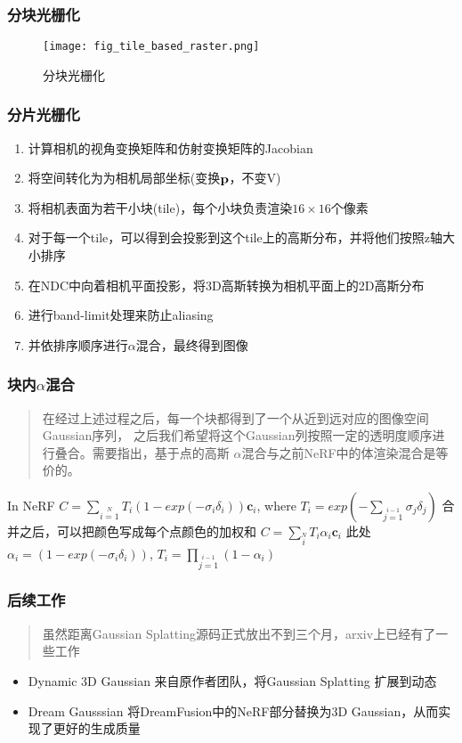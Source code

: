 \begin{frame}
    \frametitle{分块光栅化}
    \begin{figure}[H]
        \centering
        \texttt{[image: fig\_tile\_based\_raster.png]}
        \caption{分块光栅化}
        \label{fig:tile_render}
    \end{figure}
\end{frame}


\begin{frame}
    \frametitle{分片光栅化}
    \begin{enumerate}
        \item 计算相机的视角变换矩阵和仿射变换矩阵的Jacobian
        \item 将空间转化为为相机局部坐标(变换$\bf{p}$，不变V)
        \item 将相机表面为若干小块(tile)，每个小块负责渲染$16\times 16$个像素
        \item 对于每一个tile，可以得到会投影到这个tile上的高斯分布，并将他们按照z轴大小排序
        \item 在NDC中向着相机平面投影，将3D高斯转换为相机平面上的2D高斯分布
        \item 进行band-limit处理来防止aliasing 
        \item 并依排序顺序进行$\alpha$混合，最终得到图像
    \end{enumerate}
\end{frame}

\begin{frame}
    \frametitle{块内$\alpha$混合}
    \begin{quote}
        在经过上述过程之后，每一个块都得到了一个从近到远对应的图像空间Gaussian序列，
        之后我们希望将这个Gaussian列按照一定的透明度顺序进行叠合。需要指出，基于点的高斯
        $\alpha$混合与之前NeRF中的体渲染混合是等价的。
    \end{quote}
    In NeRF
    $C=\sum\limits_{i=1}\limits^{N} T_i(1-exp(-\sigma_i\delta_i))\mathbf{c}_i$, where $T_i=exp(-\sum\limits_{j=1}\limits^{i-1} \sigma_j\delta_j)$
    合并之后，可以把颜色写成每个点颜色的加权和
    $C=\sum\limits_{i}\limits^{N} T_i\alpha_i\mathbf{c}_i$
    此处
    $\alpha_i = (1-exp(-\sigma_i\delta_i))$, $T_i=\prod\limits_{j=1}\limits^{i-1}(1-\alpha_i)$
\end{frame}

\begin{frame}
    \frametitle{后续工作}
    \begin{quote}
        虽然距离Gaussian Splatting源码正式放出不到三个月，arxiv上已经有了一些工作
    \end{quote}
    \begin{itemize}
        \item Dynamic 3D Gaussian \cite{luitenDynamic3DGaussians2023} 来自原作者团队，将Gaussian Splatting 扩展到动态
        \item Dream Gausssian \cite{tangDreamGaussianGenerativeGaussian2023} 将DreamFusion\cite{pooleDreamFusionTextto3DUsing2022}中的NeRF部分替换为3D Gaussian，从而实现了更好的生成质量
    \end{itemize}
\end{frame}